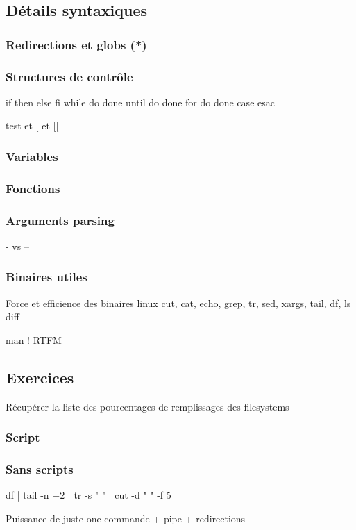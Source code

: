 \documentclass[11pt,a4paper]{article}
\begin{document}
\subsection{Détails syntaxiques}
\subsubsection{Redirections et globs (*)}
\subsubsection{Structures de contrôle}
if then else fi
while do done
until do done
for do done
case esac

test et [ et [[

\subsubsection{Variables}


\subsubsection{Fonctions}
\subsubsection{Arguments parsing}
- vs --

\subsubsection{Binaires utiles}
Force et efficience des binaires linux
cut, cat, echo, grep, tr, sed, xargs, tail, df, ls
diff

man ! RTFM
\subsection{Exercices}
Récupérer la liste des pourcentages de remplissages des filesystems

\subsubsection{Script}

\subsubsection{Sans scripts}

df | tail -n +2 | tr -s " " | cut -d " " -f 5

Puissance de juste one commande + pipe + redirections
\end{document}
